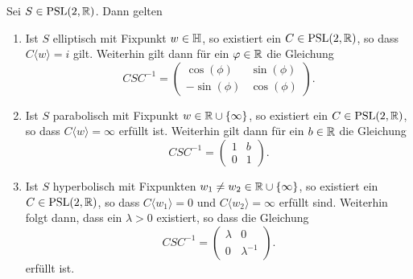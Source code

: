 \begin{lemma}
  \label{lemma:psl-trafo}
  Sei $S \in \operatorname{PSL}(2, \mathbb{R})$. Dann gelten
  \begin{enumerate}
  \item Ist $S$ elliptisch mit Fixpunkt $w \in \mathbb{H}$, so existiert ein $C \in \operatorname{PSL}(2, \mathbb{R})$, so
    dass $C\langle w \rangle = i$ gilt. Weiterhin gilt dann für ein
    $\varphi \in \mathbb{R}$ die Gleichung
    \[
    C S C^{-1} =
    \begin{pmatrix}
      \cos(\phi) & \sin(\phi) \\
      -\sin(\phi) & \cos(\phi)
    \end{pmatrix}.
    \]
  \item Ist $S$ parabolisch mit Fixpunkt $w \in \mathbb{R} \cup \{\infty\}$,
    so existiert ein $C \in \operatorname{PSL}(2, \mathbb{R})$, so dass $C\langle w\rangle =
    \infty$ erfüllt ist. Weiterhin gilt dann für ein $b \in \mathbb{R}$ die Gleichung
    \[
    C S C^{-1} =
    \begin{pmatrix}
      1 & b\\
      0 & 1
    \end{pmatrix}.
    \]
  \item Ist $S$ hyperbolisch mit Fixpunkten $w_1 \neq w_2 \in \mathbb{R} \cup
    \{\infty\}$, so existiert ein $C \in \operatorname{PSL}(2, \mathbb{R})$, so dass $C\langle
    w_1 \rangle = 0$ und $C\langle w_2 \rangle = \infty$ erfüllt
    sind. Weiterhin folgt dann, dass ein $\lambda > 0$ existiert, so dass
    die Gleichung
    \[
    C S C^{-1} = 
    \begin{pmatrix}
      \lambda & 0\\
      0 & \lambda^{-1}
    \end{pmatrix}.
    \]
    erfüllt ist.
  \end{enumerate}
\end{lemma}

